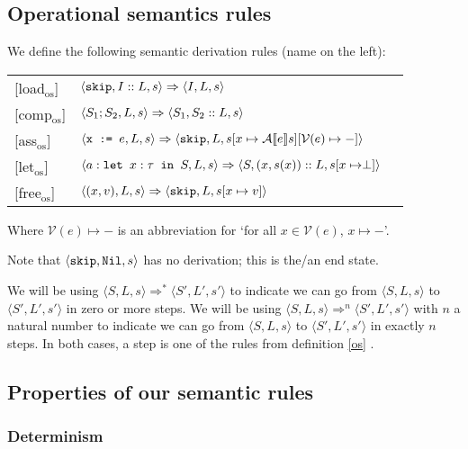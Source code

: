 \subsection{Operational semantics rules}
\begin{definition} 
\label{os}
We define the following semantic derivation rules (name on the left):

\begin{tabular}{p{5em}p{18em}p{13em}}
[load$_{\textrm{os}}$] &
\centering$\langle \texttt{skip}, I::L, s \rangle \Rightarrow \langle I, L, s \rangle$ & \medskip\\

[comp$_{\textrm{os}}$] &
\centering$\langle S_1; S_2, L, s \rangle \Rightarrow \langle S_1, S_2::L, s \rangle$ & \medskip\\

[ass$_{\textrm{os}}$] &
\centering $\langle \texttt{x := } e, L, s \rangle \Rightarrow \langle \texttt{skip}, L, s[x \mapsto \mathcal{A} \llbracket e \rrbracket s][\mathcal{V}(e)\mapsto-] \rangle$ & \medskip\\

[let$_{\textrm{os}}$] &
\centering $\langle a : \texttt{let }x : \tau \texttt{ in } S, L, s \rangle \Rightarrow \langle S, (x,s(x))::L, s[x\mapsto \perp] \rangle$ & \medskip\\

[free$_{\textrm{os}}$] &
\centering$\langle (x,v), L, s \rangle \Rightarrow \langle \texttt{skip}, L, s[x\mapsto v] \rangle$ & \medskip\\
\end{tabular} 
Where $\mathcal{V}(e)\mapsto-$ is an abbreviation for `for all $x \in \mathcal{V}(e)$, $x \mapsto -$'.
\end{definition} 
Note that $\langle \texttt{skip}, \texttt{Nil}, s \rangle$ has no derivation; this is the/an end state. 

We will be using $\langle S, L, s \rangle \Rightarrow ^{*} \langle S', L', s' \rangle$ to indicate we can go from $\langle S, L, s \rangle$ to $\langle S', L', s' \rangle$ in zero or more steps. We will be using $\langle S, L, s \rangle \Rightarrow ^{n} \langle S', L', s' \rangle$ with $n$ a natural number to indicate we can go from $\langle S, L, s \rangle$ to $\langle S', L', s' \rangle$ in exactly $n$ steps. In both cases, a step is one of the rules from definition \ref{os} .


\subsection{Properties of our semantic rules}

\subsubsection*{Determinism}


